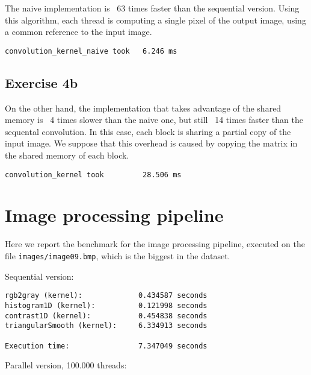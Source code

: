 \documentclass[a4paper]{article}
\begin{document}
The naive implementation is ~63 times faster than the sequential version. Using this algorithm, each thread is computing a single pixel of the output image, using a common reference to the input image.

\begin{verbatim}
convolution_kernel_naive took   6.246 ms
\end{verbatim}

\subsection{Exercise 4b}

On the other hand, the implementation that takes advantage of the shared memory is ~4 times slower than the naive one, but still ~14 times faster than the sequental convolution. In this case, each block is sharing a partial copy of the input image. We suppose that this overhead is caused by copying the matrix in the shared memory of each block.

\begin{verbatim}
convolution_kernel took         28.506 ms
\end{verbatim}

\section{Image processing pipeline}

Here we report the benchmark for the image processing pipeline, executed on the file \texttt{images/image09.bmp}, which is the biggest in the dataset.


\noindent Sequential version:

\begin{verbatim}
rgb2gray (kernel):             0.434587 seconds
histogram1D (kernel):          0.121998 seconds
contrast1D (kernel):           0.454838 seconds
triangularSmooth (kernel):     6.334913 seconds

Execution time:                7.347049 seconds
\end{verbatim}

\noindent Parallel version, 100.000 threads:
\end{document}
